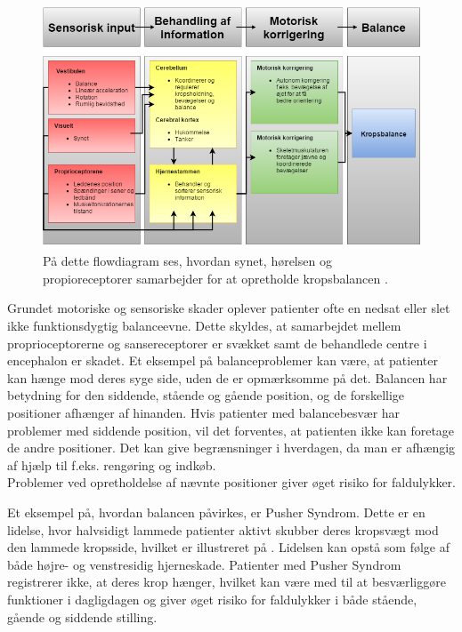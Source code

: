 \begin{figure}[H]
	\centering
	\includegraphics[scale=0.6]{figures/bProblemanalyse/Balance-Flowdiagram.png}
	\caption{På dette flowdiagram ses, hvordan synet, hørelsen og propioreceptorer samarbejder for at opretholde kropsbalancen \cite{watson2015}.}
	\label{flowbalance}
\end{figure}

Grundet motoriske og sensoriske skader oplever patienter ofte en nedsat eller slet ikke funktionsdygtig balanceevne.\cite{Karnath2003} Dette skyldes, at samarbejdet mellem proprioceptorerne og sansereceptorer er svækket samt de behandlede centre i encephalon er skadet. \cite{Martini2012}
Et eksempel på balanceproblemer kan være, at patienter kan hænge mod deres syge side, uden de er opmærksomme på det. Balancen har betydning for den siddende, stående og gående position, og de forskellige positioner afhænger af hinanden. Hvis patienter med balancebesvær har problemer med siddende position, vil det forventes, at patienten ikke kan foretage de andre positioner. Det kan give begrænsninger i hverdagen, da man er afhængig af hjælp til f.eks. rengøring og indkøb. \cite{Karnath2003} \\
Problemer ved opretholdelse af nævnte positioner giver øget risiko for faldulykker.\cite{Karnath2003} 

Et eksempel på, hvordan balancen påvirkes, er Pusher Syndrom. Dette er en lidelse, hvor halvsidigt lammede patienter aktivt skubber deres kropsvægt mod den lammede kropsside, hvilket er illustreret på . Lidelsen kan opstå som følge af både højre- og venstresidig hjerneskade. Patienter med Pusher Syndrom registrerer ikke, at deres krop hænger, hvilket kan være med til at besværliggøre funktioner i dagligdagen og giver øget risiko for faldulykker i både stående, gående og siddende stilling. \cite{Karnath2003} 

